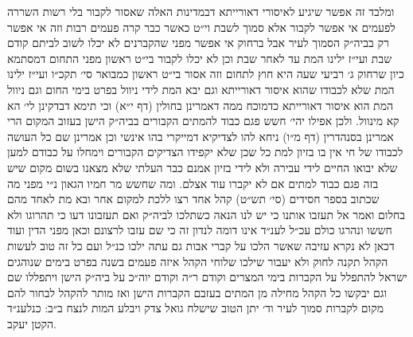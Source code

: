 \documentclass[12pt, openany]{book}
\begin{document}
\begin{multicols}{2}
ומלבד זה אפשר שיגיע לאיסורי דאורייתא דבמדינות האלה שאסור לקבור בלי רשות השררה לפעמים אי אפשר לקבור אלא סמוך לשבת וי״ט כאשר כבר קרה פעמים רבות וזה אי אפשר רק בביה״ק הסמוך לעיר אבל ברחוק אי אפשר מפני שהקברנים לא יכלו לשוב לביתם קודם שבת ועי״ז ילינו המת עד לאחר שבת וכן לא יכלו לקבור בי״ט ראשון מפני התחום דמסתמא כיון שרחוק ג׳ רביעי שעה היא חוץ לתחום וזה אסור בי״ט ראשון כמבואר סי׳ תקכ״ו ועי״ז ילינו המת שלא לכבודו שהוא איסור דאורייתא וגם יבא המת לידי ניוול בפרט בימי החום וגם ניוול המת הוא איסור דאורייתא כדמוכח ממה דאמרינן בחולין (דף י״א) וכי תימא דבדקינן לי׳ הא קא מינוול. ולכן אפילו יהי׳ חשש פגם כבוד להמתים הקבורים בביה״ק הישן בעזוב המקום הרי אמרינן בסנהדרין (דף מ״ו) ניחא להו לצדיקיא דמייקרי בהו אינשי וכן אמרינן שם כל העושה לכבודו של חי אין בו בזיון למת כל שכן שלא יקפידו הצדיקים הקבורים וימחלו על כבודם למען שלא יבואו החיים לידי עבירה ולא לידי בזיון אמנם כבר העלתי שלא מצאנו בשום מקום שיש בזה פגם כבוד למתים אם לא יקברו עוד אצלם. ומה שחשש מר חמיו הגאון נ״י מפני מה שכתוב בספר חסידים (סי׳ תש״ט) קהל אחד רצו ללכת למקום אחר ובא מת לאחד מהם בחלום ואמר אל תעזבו אותנו כי יש לנו הנאה כשתלכו לביה״ק ואם תעזבונו דעו כי תהרוגו ולא חששו ונהרגו כולם עכ״ל לענ״ד אינו דומה לנדון זה כי שם עזבו לרצונם וכאן מפני הדין ועוד דכאן לא נקרא עזיבה שאשר הלכו על קברי אבות גם עתה ילכו כנ״ל ועם כל זה טוב לעשות הקהל תקנה לחוק ולא יעבור שילכו שלוחי הקהל איזה פעמים בשנה בפרט בימים שנוהגים ישראל להתפלל על הקברות בימי המצרים וקודם ר״ה וקודם יוה״כ על ביה״ק הישן ויתפללו שם וגם יבקשו כל הקהל מחילה מן המתים בעזבם הקברות הישן ואז מותר להקהל לבחור להם מקום לקברות סמוך לעיר וד׳ יתן הטוב שישלח גואל צדק ויבלע המות לנצח ב״ב: כנלענ״ד הקטן יעקב.\\\vspace{0pt}

\end{multicols}\newpage
\end{document}
